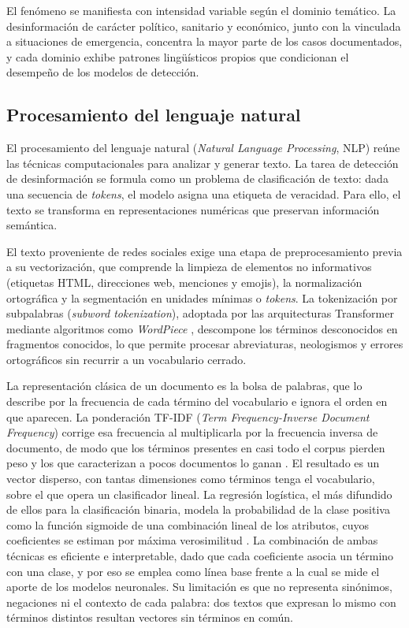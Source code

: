 El fenómeno se manifiesta con intensidad variable según el dominio temático. La desinformación de carácter político, sanitario y económico, junto con la vinculada a situaciones de emergencia, concentra la mayor parte de los casos documentados, y cada dominio exhibe patrones lingüísticos propios que condicionan el desempeño de los modelos de detección.

\subsection{Procesamiento del lenguaje natural}

El procesamiento del lenguaje natural (\textit{Natural Language Processing}, NLP) reúne las técnicas computacionales para analizar y generar texto. La tarea de detección de desinformación se formula como un problema de clasificación de texto: dada una secuencia de \textit{tokens}, el modelo asigna una etiqueta de veracidad. Para ello, el texto se transforma en representaciones numéricas que preservan información semántica.

El texto proveniente de redes sociales exige una etapa de preprocesamiento previa a su vectorización, que comprende la limpieza de elementos no informativos (etiquetas HTML, direcciones web, menciones y emojis), la normalización ortográfica y la segmentación en unidades mínimas o \textit{tokens}. La tokenización por subpalabras (\textit{subword tokenization}), adoptada por las arquitecturas Transformer mediante algoritmos como \textit{WordPiece} \parencite{SchusterNakajima2012}, descompone los términos desconocidos en fragmentos conocidos, lo que permite procesar abreviaturas, neologismos y errores ortográficos sin recurrir a un vocabulario cerrado.

La representación clásica de un documento es la bolsa de palabras, que lo describe por la frecuencia de cada término del vocabulario e ignora el orden en que aparecen. La ponderación TF-IDF (\textit{Term Frequency-Inverse Document Frequency}) corrige esa frecuencia al multiplicarla por la frecuencia inversa de documento, de modo que los términos presentes en casi todo el corpus pierden peso y los que caracterizan a pocos documentos lo ganan \parencite{SaltonBuckley1988}. El resultado es un vector disperso, con tantas dimensiones como términos tenga el vocabulario, sobre el que opera un clasificador lineal. La regresión logística, el más difundido de ellos para la clasificación binaria, modela la probabilidad de la clase positiva como la función sigmoide de una combinación lineal de los atributos, cuyos coeficientes se estiman por máxima verosimilitud \parencite{Cox1958}. La combinación de ambas técnicas es eficiente e interpretable, dado que cada coeficiente asocia un término con una clase, y por eso se emplea como línea base frente a la cual se mide el aporte de los modelos neuronales. Su limitación es que no representa sinónimos, negaciones ni el contexto de cada palabra: dos textos que expresan lo mismo con términos distintos resultan vectores sin términos en común.

